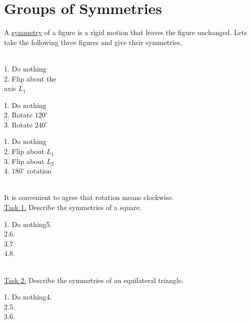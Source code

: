 \documentclass[12pt]{book}
\theoremstyle{definition}
\begin{document}
\section{Groups of Symmetries}
A \underline{symmetry} of a figure is a rigid motion that leaves the figure unchanged.  Lets take the following three figures and give their symmetries.\\[.1in]
\begin{minipage}{2in}
\begin{singlespace}
\\
1. Do nothing\\
2. Flip about the\\
\phantom{2. }axis $L_1$
\end{singlespace}
\end{minipage}
\begin{minipage}{2in}
\def\svgwidth{1in}

\begin{singlespace}
1. Do nothing\\
2. Rotate $120^\circ$\\
3. Rotate $240^\circ$\\
\end{singlespace}
\end{minipage}
\begin{minipage}{2in}

\begin{singlespace}
1. Do nothing\\
2. Flip about $L_1$\\
3. Flip about $L_2$\\
4. $180^\circ$ rotation\\
\end{singlespace}
\end{minipage}\\[.1in]
It is convenient to agree that rotation means clockwise.\\[.1in]
\underline{Task 1.}  Describe the symmetries of a square.\\[.2in]
\begin{minipage}{2 in}

\end{minipage}
\begin{minipage}{3 in}
1. Do nothing\hfill 5.\\
2.\hfill 6.\\
3.\hfill7.\\
4.\hfill8.
\end{minipage}\\[.5 in]
\underline{Task 2.}  Describe the symmetries of an equilateral triangle.\\[.1 in]
\begin{minipage}{2 in}

\end{minipage}
\begin{minipage}{3 in}
1. Do nothing\hfill 4.\\
2.\hfill 5.\\
3.\hfill 6.
\end{minipage}\\[.2 in]
\end{document}
